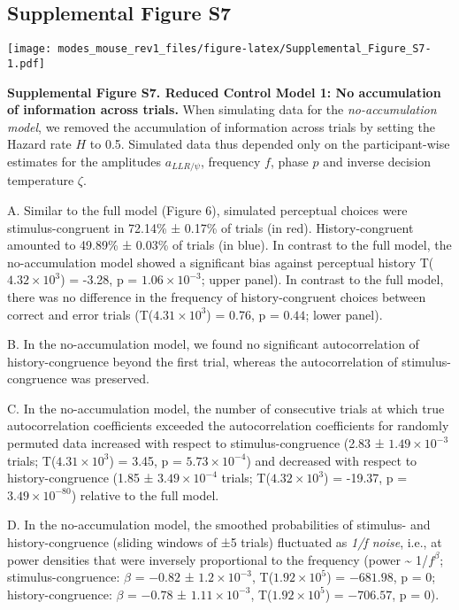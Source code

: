 \documentclass[
]{article}
\begin{document}
\newpage

\hypertarget{supplemental-figure-s7}{%
\subsection{Supplemental Figure S7}\label{supplemental-figure-s7}}

\texttt{[image: modes\_mouse\_rev1\_files/figure-latex/Supplemental\_Figure\_S7-1.pdf]}

\textbf{Supplemental Figure S7. Reduced Control Model 1: No accumulation
of information across trials.} When simulating data for the
\emph{no-accumulation model}, we removed the accumulation of information
across trials by setting the Hazard rate \(H\) to 0.5. Simulated data
thus depended only on the participant-wise estimates for the amplitudes
\(a_{LLR/\psi}\), frequency \(f\), phase \(p\) and inverse decision
temperature \(\zeta\).

A. Similar to the full model (Figure 6), simulated perceptual choices
were stimulus-congruent in 72.14\% ± 0.17\% of trials (in red).
History-congruent amounted to 49.89\% ± 0.03\% of trials (in blue). In
contrast to the full model, the no-accumulation model showed a
significant bias against perceptual history
T(\ensuremath{4.32\times 10^{3}}) = -3.28, p =
\(\ensuremath{1.06\times 10^{-3}}\); upper panel). In contrast to the
full model, there was no difference in the frequency of
history-congruent choices between correct and error trials
(T(\ensuremath{4.31\times 10^{3}}) = 0.76, p = \(0.44\); lower panel).

B. In the no-accumulation model, we found no significant autocorrelation
of history-congruence beyond the first trial, whereas the
autocorrelation of stimulus-congruence was preserved.

C. In the no-accumulation model, the number of consecutive trials at
which true autocorrelation coefficients exceeded the autocorrelation
coefficients for randomly permuted data increased with respect to
stimulus-congruence (2.83 ± \ensuremath{1.49\times 10^{-3}} trials;
T(\ensuremath{4.31\times 10^{3}}) = 3.45, p =
\(\ensuremath{5.73\times 10^{-4}}\)) and decreased with respect to
history-congruence (1.85 ± \ensuremath{3.49\times 10^{-4}} trials;
T(\ensuremath{4.32\times 10^{3}}) = -19.37, p =
\(\ensuremath{3.49\times 10^{-80}}\)) relative to the full model.

D. In the no-accumulation model, the smoothed probabilities of stimulus-
and history-congruence (sliding windows of ±5 trials) fluctuated as
\emph{1/f noise}, i.e., at power densities that were inversely
proportional to the frequency (power \textasciitilde{} 1/\(f^\beta\);
stimulus-congruence: \(\beta\) = \(-0.82\) ±
\(\ensuremath{1.2\times 10^{-3}}\),
T(\(\ensuremath{1.92\times 10^{5}}\)) = \(-681.98\), p = \(0\);
history-congruence: \(\beta\) = \(-0.78\) ±
\(\ensuremath{1.11\times 10^{-3}}\),
T(\(\ensuremath{1.92\times 10^{5}}\)) = \(-706.57\), p = \(0\)).
\end{document}
